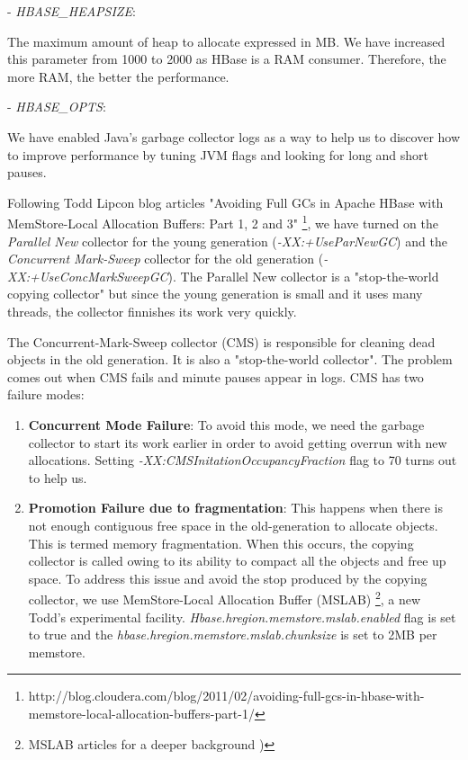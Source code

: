 \begin{enumerate}
- \textit{HBASE\_HEAPSIZE}: 
\par
The maximum amount of heap to allocate expressed in MB. We have increased this parameter from 1000 to 2000 as HBase is a RAM consumer. Therefore, the more RAM, the better the performance.
\par
- \textit{HBASE\_OPTS}:
\par
We have enabled Java's garbage collector logs as a way to help us to discover how to improve performance by tuning JVM flags and looking for long and short pauses. 
\par
Following Todd Lipcon blog articles "Avoiding Full GCs in Apache HBase with MemStore-Local Allocation Buffers: Part 1, 2 and 3" \footnote{http://blog.cloudera.com/blog/2011/02/avoiding-full-gcs-in-hbase-with-memstore-local-allocation-buffers-part-1/}, we have turned on the \textit{Parallel New} collector for the young generation (\textit{-XX:+UseParNewGC}) and the \textit{Concurrent Mark-Sweep} collector for the old generation (\textit{-XX:+UseConcMarkSweepGC}). The Parallel New collector is a "stop-the-world copying collector" but since the young generation is small and it uses many threads, the collector finnishes its work very quickly.
\par
The Concurrent-Mark-Sweep collector (CMS) is responsible for cleaning dead objects in the old generation. It is also a "stop-the-world collector". The problem comes out when CMS fails and minute pauses appear in logs. CMS has two failure modes:
\begin{enumerate}
\item \textbf{Concurrent Mode Failure}: To avoid this mode, we need the garbage collector to start its work earlier in order to avoid getting overrun with new allocations. Setting \textit{-XX:CMSInitationOccupancyFraction} flag to 70 turns out to help us.
\item \textbf{Promotion Failure due to fragmentation}: This happens when there is not enough contiguous free space in the old-generation to allocate objects. This is termed memory fragmentation. When this occurs, the copying collector is called owing to its ability to compact all the objects and free up space. To address this issue and avoid the stop produced by the copying collector, we use MemStore-Local Allocation Buffer (MSLAB) \footnote{MSLAB articles for a deeper background \cite{ApacheHBaseMSLAB} \cite{MSLAB})}, a new Todd's experimental facility.  \textit{Hbase.hregion.memstore.mslab.enabled} flag is set to true and the \textit{hbase.hregion.memstore.mslab.chunksize} is set to 2MB per memstore.


\end{enumerate}
\end{enumerate}
